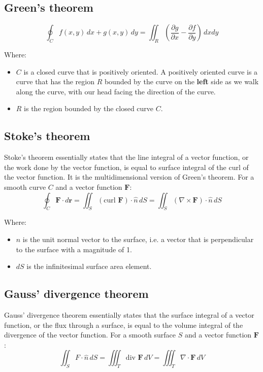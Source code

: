 \documentclass[11pt]{article}
\begin{document}
 \newpage

\subsection{Green's theorem}
\label{sec:org9c904cd}
\[\oint_C f(x, y) \, dx + g (x, y) \, dy = \iint_R \left(\frac{\partial g}{\partial x} - \frac{\partial f}{\partial y} \right) \, dx dy\]

Where:
\begin{itemize}
\item \(C\) is a closed curve that is positively oriented. A positively oriented curve is a curve that has the region \(R\) bounded by the curve on the \textbf{left} side as we walk along the curve, with our head facing the direction of the curve.
\item \(R\) is the region bounded by the closed curve \(C\).
\end{itemize}

\subsection{Stoke's theorem}
\label{sec:orgb95e558}
Stoke's theorem essentially states that the line integral of a vector function, or the work done by the vector function, is equal to surface integral of the curl of the vector function. It is the multidimensional version of Green's theorem.
For a smooth curve \(C\) and a vector function \(\boldsymbol{F}\):
\[\oint_C \boldsymbol{F} \cdot d \boldsymbol{r} = \iint_S (\text{curl } \boldsymbol{F}) \cdot \hat{n} \, dS = \iint_S (\nabla \times \boldsymbol{F}) \cdot \hat{n} \, dS\]

Where:
\begin{itemize}
\item \(\hat{n}\) is the unit normal vector to the surface, i.e. a vector that is perpendicular to the surface with a magnitude of 1.
\item \(dS\) is the infinitesimal surface area element.
\end{itemize}

\subsection{Gauss' divergence theorem}
\label{sec:org35b1bac}
Gauss' divergence theorem essentially states that the surface integral of a vector function, or the flux through a surface, is equal to the volume integral of the divergence of the vector function.
For a smooth surface \(S\) and a vector function \(\boldsymbol{F}\):
\[\iint_S F \cdot \hat{n} \, dS = \iiint_T \text{div } \boldsymbol{F} \, dV = \iiint_T \nabla \cdot \boldsymbol{F} \, dV\]
\end{document}
